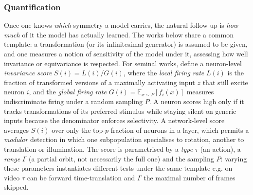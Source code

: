 \documentclass[mathematics,review,submit,moreauthors]{Definitions/mdpi}
\begin{document}
\subsubsection{Quantification}
Once one knows \emph{which} symmetry a model carries, the natural follow-up is \emph{how much} of it the model has actually learned.
The works below share a common template: a transformation (or its infinitesimal generator) is assumed to be given, and one measures a notion of sensitivity of the model under it, assessing how well invariance or equivariance is respected.\newline
For seminal works, \citet{goodfellow2009anips} define a neuron-level \emph{invariance score} $S(i) = L(i)/G(i)$, where the \emph{local firing rate} $L(i)$ is the fraction of transformed versions of a maximally activating input $z$ that still excite neuron $i$, and the \emph{global firing rate} $G(i) = \mathbb{E}_{x\sim P}[f_i(x)]$ measures indiscriminate firing under a random sampling $P$.
A neuron scores high only if it tracks transformations of its preferred stimulus while staying silent on generic inputs because the denominator enforces selectivity.
A network-level score averages $S(i)$ over only the top-$p$ fraction of neurons in a layer, which permits a \emph{modular} detection in which one subpopulation specialises to rotation, another to translation or illumination.
The score is parametrised by a \emph{type} $\tau$ (an action), a \emph{range} $\Gamma$ (a partial orbit, not necessarily the full one) and the sampling $P$: varying these parameters instantiates different tests under the same template e.g. on video $\tau$ can be forward time-translation and $\Gamma$ the maximal number of frames skipped.
\end{document}

